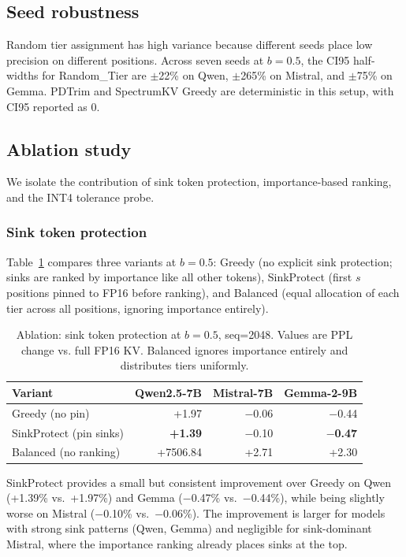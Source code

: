 \documentclass[11pt]{article}
\newcommand{\method}{SpectrumKV}
\newcommand{\budget}{b}
\newcommand{\pct}{\%}
\theoremstyle{plain}
\theoremstyle{definition}
\begin{document}
\subsection{Seed robustness}
Random tier assignment has high variance because different seeds place low precision on different positions.  Across seven seeds at $\budget=0.5$, the CI95 half-widths for Random\_Tier are $\pm$22\pct{} on Qwen, $\pm$265\pct{} on Mistral, and $\pm$75\pct{} on Gemma.  PDTrim and \method{} Greedy are deterministic in this setup, with CI95 reported as 0.

\subsection{Ablation study}
\label{sec:ablation}

We isolate the contribution of sink token protection, importance-based ranking, and the INT4 tolerance probe.

\subsubsection{Sink token protection}
\label{sec:ablation-sink}

Table~\ref{tab:ablation-sink} compares three variants at $\budget=0.5$: Greedy (no explicit sink protection; sinks are ranked by importance like all other tokens), SinkProtect (first $s$ positions pinned to FP16 before ranking), and Balanced (equal allocation of each tier across all positions, ignoring importance entirely).

\begin{table}[t]
\centering
\caption{Ablation: sink token protection at $\budget=0.5$, seq=2048.  Values are PPL change vs. full FP16 KV.  Balanced ignores importance entirely and distributes tiers uniformly.}
\label{tab:ablation-sink}
\small
\begin{tabular}{lrrr}
\toprule
Variant & Qwen2.5-7B & Mistral-7B & Gemma-2-9B \\
\midrule
Greedy (no pin) & +1.97 & $-$0.06 & $-$0.44 \\
SinkProtect (pin sinks) & \textbf{+1.39} & $-$0.10 & \textbf{$-$0.47} \\
Balanced (no ranking) & +7506.84 & +2.71 & +2.30 \\
\bottomrule
\end{tabular}
\end{table}

SinkProtect provides a small but consistent improvement over Greedy on Qwen (+1.39\pct{} vs.\ +1.97\pct{}) and Gemma ($-$0.47\pct{} vs.\ $-$0.44\pct{}), while being slightly worse on Mistral ($-$0.10\pct{} vs.\ $-$0.06\pct{}).  The improvement is larger for models with strong sink patterns (Qwen, Gemma) and negligible for sink-dominant Mistral, where the importance ranking already places sinks at the top.
\end{document}
